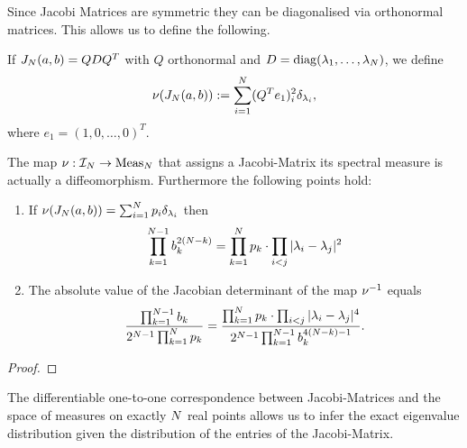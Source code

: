Since Jacobi Matrices are symmetric they can be diagonalised via orthonormal matrices. This allows us to define the following.

\begin{definition}
    If $J_N(a,b) = QDQ^T$ with $Q$ orthonormal and $D = \operatorname{diag}(\lambda_1, \ldots, \lambda_N)$, we define
    \begin{align*}
        \nu(J_N(a,b)) := \sum_{i=1}^{N} (Q^T e_1)^2_i \delta_{\lambda_i},
    \end{align*}
    where $e_1 = (1,0,\ldots,0)^T$.
\end{definition}

\begin{theorem}\label{thm: trafoTheorem}
    The map $\nu: \mathcal{I}_N \to \operatorname{Meas}_N$ that assigns a Jacobi-Matrix its spectral measure is actually a diffeomorphism. Furthermore the following points hold:
    \begin{enumerate}[label=(\alph*)]
        \item If $\nu(J_N(a,b)) = \sum_{i=1}^N p_i \delta_{\lambda_i}$ then
        \begin{align}
            \prod_{k=1}^{N-1} b_k^{2(N-k)} = \prod_{k=1}^N p_k \cdot \prod_{i<j} |\lambda_i - \lambda_j|^2
        \end{align}
        \item The absolute value of the Jacobian determinant of the map $\nu^{-1}$ equals
        \begin{align}\label{inverseSpectralDet}
            \frac{\prod_{k=1}^{N-1} b_k}{2^{N-1} \prod_{k=1}^N p_k} 
            = \frac{\prod_{k=1}^N p_k \cdot \prod_{i<j} |\lambda_i - \lambda_j|^4}{2^{N-1} \prod_{k=1}^{N-1} b_k^{4(N - k)-1}}.
        \end{align}
    \end{enumerate}
\end{theorem}
\begin{proof}
\end{proof}

The differentiable one-to-one correspondence between Jacobi-Matrices and the space of measures on exactly $N$ real points allows us to infer the exact eigenvalue distribution given the distribution of the entries of the Jacobi-Matrix.

